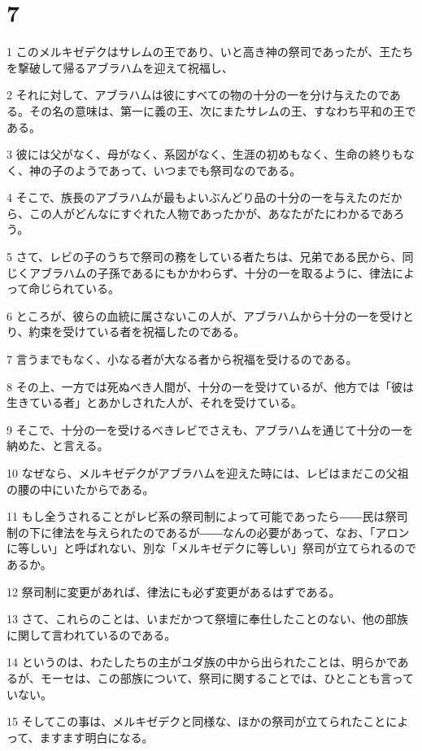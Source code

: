 \chapter{7}

\par 1 このメルキゼデクはサレムの王であり、いと高き神の祭司であったが、王たちを撃破して帰るアブラハムを迎えて祝福し、
\par 2 それに対して、アブラハムは彼にすべての物の十分の一を分け与えたのである。その名の意味は、第一に義の王、次にまたサレムの王、すなわち平和の王である。
\par 3 彼には父がなく、母がなく、系図がなく、生涯の初めもなく、生命の終りもなく、神の子のようであって、いつまでも祭司なのである。
\par 4 そこで、族長のアブラハムが最もよいぶんどり品の十分の一を与えたのだから、この人がどんなにすぐれた人物であったかが、あなたがたにわかるであろう。
\par 5 さて、レビの子のうちで祭司の務をしている者たちは、兄弟である民から、同じくアブラハムの子孫であるにもかかわらず、十分の一を取るように、律法によって命じられている。
\par 6 ところが、彼らの血統に属さないこの人が、アブラハムから十分の一を受けとり、約束を受けている者を祝福したのである。
\par 7 言うまでもなく、小なる者が大なる者から祝福を受けるのである。
\par 8 その上、一方では死ぬべき人間が、十分の一を受けているが、他方では「彼は生きている者」とあかしされた人が、それを受けている。
\par 9 そこで、十分の一を受けるべきレビでさえも、アブラハムを通じて十分の一を納めた、と言える。
\par 10 なぜなら、メルキゼデクがアブラハムを迎えた時には、レビはまだこの父祖の腰の中にいたからである。
\par 11 もし全うされることがレビ系の祭司制によって可能であったら――民は祭司制の下に律法を与えられたのであるが――なんの必要があって、なお、「アロンに等しい」と呼ばれない、別な「メルキゼデクに等しい」祭司が立てられるのであるか。
\par 12 祭司制に変更があれば、律法にも必ず変更があるはずである。
\par 13 さて、これらのことは、いまだかつて祭壇に奉仕したことのない、他の部族に関して言われているのである。
\par 14 というのは、わたしたちの主がユダ族の中から出られたことは、明らかであるが、モーセは、この部族について、祭司に関することでは、ひとことも言っていない。
\par 15 そしてこの事は、メルキゼデクと同様な、ほかの祭司が立てられたことによって、ますます明白になる。
